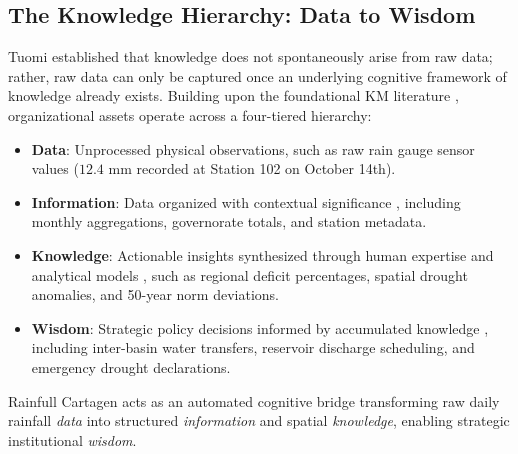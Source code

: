 \documentclass[12pt,a4paper]{report}
\begin{document}
\subsection{The Knowledge Hierarchy: Data to Wisdom}
Tuomi \cite{tuomi1999} established that knowledge does not spontaneously arise from raw data; rather, raw data can only be captured once an underlying cognitive framework of knowledge already exists. Building upon the foundational KM literature \cite{davenport1998, king2005}, organizational assets operate across a four-tiered hierarchy:
\begin{itemize}
  \item \textbf{Data}: Unprocessed physical observations, such as raw rain gauge sensor values ($12.4\text{ mm}$ recorded at Station 102 on October 14th).
  \item \textbf{Information}: Data organized with contextual significance \cite{davenport1998}, including monthly aggregations, governorate totals, and station metadata.
  \item \textbf{Knowledge}: Actionable insights synthesized through human expertise and analytical models \cite{nonaka1994}, such as regional deficit percentages, spatial drought anomalies, and 50-year norm deviations.
  \item \textbf{Wisdom}: Strategic policy decisions informed by accumulated knowledge \cite{king2005}, including inter-basin water transfers, reservoir discharge scheduling, and emergency drought declarations.
\end{itemize}

Rainfull Cartagen acts as an automated cognitive bridge transforming raw daily rainfall \textit{data} into structured \textit{information} and spatial \textit{knowledge}, enabling strategic institutional \textit{wisdom}.
\end{document}
